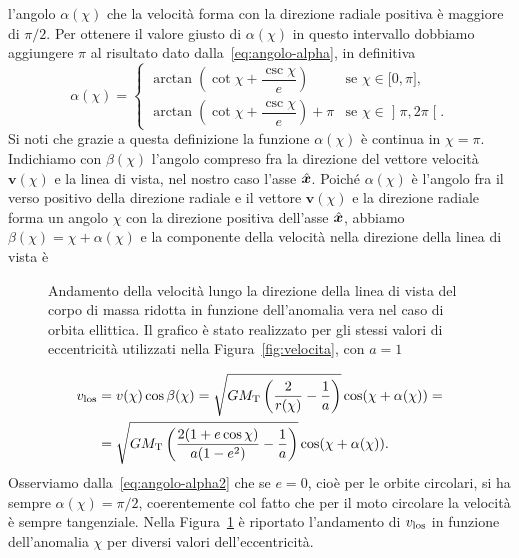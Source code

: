 {l'angolo $\alpha(\chi)$ che la velocità forma con la direzione radiale positiva
è maggiore di $\pi/2$. Per ottenere il valore giusto di $\alpha(\chi)$ in questo
intervallo dobbiamo aggiungere $\pi$ al risultato dato
dalla~\eqref{eq:angolo-alpha}, in definitiva
\begin{equation}
  \label{eq:angolo-alpha2}
  \alpha(\chi) =
  \begin{cases}
    \arctan
     \left(
    \cot\chi + \dfrac{\csc\chi}{e}
  \right) & \text{se $\chi \in \mathopen{[}0, \pi\mathclose{]}$,}\\[2ex]
  \arctan
  \left(
    \cot\chi + \dfrac{\csc\chi}{e}
  \right) + \pi & \text{se $\chi \in \mathopen{]}\pi, 2\pi\mathclose{[}$.}
  \end{cases}
\end{equation}
Si noti che grazie a questa definizione la funzione $\alpha(\chi)$ è continua
in $\chi = \pi$. Indichiamo con $\beta(\chi)$ l'angolo compreso fra la
direzione del vettore velocità $\bm{v}(\chi)$ e la linea di vista, nel nostro
caso l'asse $\hat{\bm{x}}$. Poiché $\alpha(\chi)$ è l'angolo fra il verso
positivo della direzione radiale e il vettore $\bm{v}(\chi)$ e la direzione
radiale forma un angolo $\chi$ con la direzione positiva dell'asse
$\hat{\bm{x}}$, abbiamo $\beta(\chi) = \chi + \alpha(\chi)$ e la componente
della velocità nella direzione della linea di vista è
\begin{figure}
  \centering
  
  \caption[Andamento della velocità nella direzione della di vista in funzione
  dell'anomalia
  vera]{Andamento della velocità lungo la direzione della linea di vista del
    corpo di massa ridotta in funzione dell'anomalia vera nel caso di orbita
    ellittica. Il grafico è stato realizzato per gli stessi valori di
    eccentricità utilizzati nella Figura~\ref{fig:velocita}, con $a=1$}
  \label{fig:velocita-los}
\end{figure}
\begin{equation}
  \begin{split}
    v_\textup{los} &= v(\chi)\cos\beta(\chi) = \sqrt{GM_\textup{T} \left(
      \frac{2}{r(\chi)} - \frac{1}{a}
    \right)}\cos(\chi + \alpha(\chi)) = \\
    &= \sqrt{GM_\textup{T}
    \left(
      \frac{2(1+e\cos\chi)}{a(1-e^2)} - \frac{1}{a}
    \right)}\cos(\chi + \alpha(\chi)).
  \end{split}
\end{equation}
Osserviamo dalla~\eqref{eq:angolo-alpha2} che se $e=0$, cioè per le orbite
circolari, si ha sempre $\alpha(\chi) = \pi/2$, coerentemente col fatto che
per il moto circolare la velocità è sempre tangenziale. Nella
Figura~\ref{fig:velocita-los} è riportato l'andamento di $v_\textup{los}$ in
funzione dell'anomalia $\chi$ per diversi valori dell'eccentricità.

}
